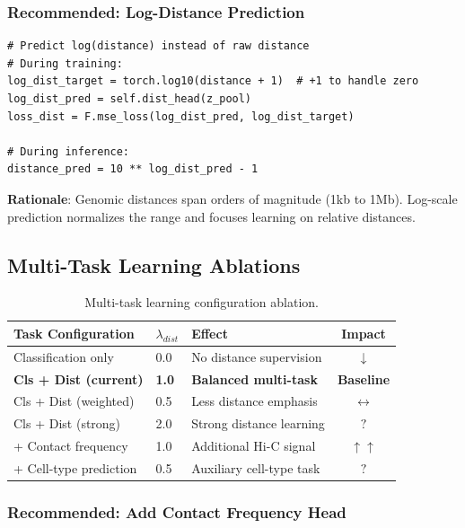 \documentclass[11pt,a4paper]{article}
\begin{document}
\subsubsection{Recommended: Log-Distance Prediction}

\begin{verbatim}
# Predict log(distance) instead of raw distance
# During training:
log_dist_target = torch.log10(distance + 1)  # +1 to handle zero
log_dist_pred = self.dist_head(z_pool)
loss_dist = F.mse_loss(log_dist_pred, log_dist_target)

# During inference:
distance_pred = 10 ** log_dist_pred - 1
\end{verbatim}

\textbf{Rationale}: Genomic distances span orders of magnitude (1kb to 1Mb). Log-scale prediction normalizes the range and focuses learning on relative distances.

\subsection{Multi-Task Learning Ablations}

\begin{table}[H]
\centering
\begin{tabular}{L{4cm}L{3cm}L{4cm}c}
\toprule
\textbf{Task Configuration} & \textbf{$\lambda_{dist}$} & \textbf{Effect} & \textbf{Impact} \\
\midrule
Classification only & 0.0 & No distance supervision & \textcolor{negative}{$\downarrow$} \\
\textbf{Cls + Dist (current)} & \textbf{1.0} & \textbf{Balanced multi-task} & \textbf{Baseline} \\
Cls + Dist (weighted) & 0.5 & Less distance emphasis & \textcolor{neutral}{$\leftrightarrow$} \\
Cls + Dist (strong) & 2.0 & Strong distance learning & \textcolor{uncertain}{$?$} \\
+ Contact frequency & 1.0 & Additional Hi-C signal & \textcolor{positive}{$\uparrow\uparrow$} \\
+ Cell-type prediction & 0.5 & Auxiliary cell-type task & \textcolor{uncertain}{$?$} \\
\bottomrule
\end{tabular}
\caption{Multi-task learning configuration ablation.}
\end{table}

\subsubsection{Recommended: Add Contact Frequency Head}
\end{document}
